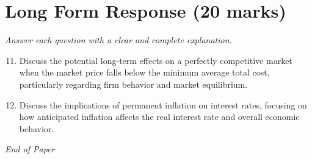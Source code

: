 \documentclass[12pt]{article}
\begin{document}
\section*{Long Form Response (20 marks)}
\textit{Answer each question with a clear and complete explanation.}
\begin{enumerate}[label=\arabic*.]
\setcounter{enumi}{10}
\item Discuss the potential long-term effects on a perfectly competitive market when the market price falls below the minimum average total cost, particularly regarding firm behavior and market equilibrium.
\item Discuss the implications of permanent inflation on interest rates, focusing on how anticipated inflation affects the real interest rate and overall economic behavior.
\end{enumerate}

\vfill
\noindent\textit{End of Paper}
\end{document}
